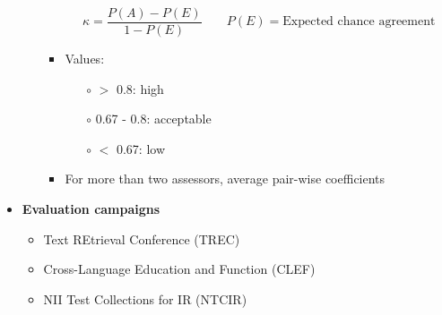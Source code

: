 \begin{itemize}
\begin{itemize}
\begin{itemize}
            $$\kappa = \frac{P(A) - P(E)}{1 - P(E)} \;\;\;\;\;\;\; P(E) = \text{Expected chance agreement}$$ 
            \item Values:
            \begin{itemize}
                \item[$\circ$] $>$ 0.8: high
                \item[$\circ$] 0.67 - 0.8: acceptable
                \item[$\circ$] $<$ 0.67: low
            \end{itemize}
            \item For more than two assessors, average pair-wise coefficients
        \end{itemize}
    \end{itemize}
    \item \textbf{Evaluation campaigns}
    \begin{itemize}
        \item Text REtrieval Conference (TREC)
        \item Cross-Language Education and Function (CLEF)
        \item NII Test Collections for IR (NTCIR)
    \end{itemize}
\end{itemize}
